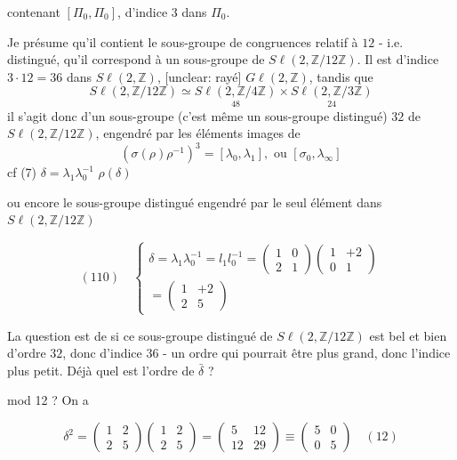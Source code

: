 contenant $[\Pi_0, \Pi_0]$, d'indice $3$ dans $\Pi_0$.

Je présume qu'il contient le sous-groupe
de congruences relatif à $12$ - i.e. distingué,
qu'il correspond à un sous-groupe de
$S\ell(2, \mathbb{Z}/12\mathbb{Z})$. Il est d'indice
$3 \cdot 12 = 36$ dans $S\ell(2, \mathbb{Z})$, [unclear: rayé] $G\ell(2, \mathbb{Z})$,
tandis que $$S\ell(2, \mathbb{Z}/12\mathbb{Z}) \simeq \underset{48}{S\ell(2, \mathbb{Z}/4\mathbb{Z})} \times \underset{24}{S\ell(2, \mathbb{Z}/3\mathbb{Z})}$$
il s'agit donc d'un sous-groupe (c'est même un sous-groupe distingué)
$32$ de $S\ell(2, \mathbb{Z}/12\mathbb{Z})$, engendré par les
éléments images de
$$ (\sigma(\rho)\rho^{-1})^3 = [\lambda_0, \lambda_1], \text{ ou } [\sigma_0, \lambda_\infty] $$
cf (7)
$\delta = \lambda_1 \lambda_0^{-1}$
$\rho(\delta)$

ou encore le sous-groupe distingué engendré par
le seul élément dans $S\ell(2, \mathbb{Z}/12\mathbb{Z})$

$$ (110) \quad \left\{ \begin{array}{l} \delta = \lambda_1 \lambda_0^{-1} = l_1 l_0^{-1} = \left(\begin{array}{cc} 1 & 0 \\ 2 & 1 \end{array}\right) \left(\begin{array}{cc} 1 & +2 \\ 0 & 1 \end{array}\right) \\ = \left(\begin{array}{cc} 1 & +2 \\ 2 & 5 \end{array}\right) \end{array} \right. $$

La question est de si ce sous-groupe
distingué de $S\ell(2, \mathbb{Z}/12\mathbb{Z})$ est bel et
bien d'ordre $32$, donc d'indice $36$ - un
ordre qui pourrait être plus grand, donc l'indice
plus petit. Déjà quel est l'ordre de $\bar{\delta}$ ?

\newpage


mod 12 ? On a

$$ \delta^2 = \begin{pmatrix} 1 & 2 \\ 2 & 5 \end{pmatrix} \begin{pmatrix} 1 & 2 \\ 2 & 5 \end{pmatrix} = \begin{pmatrix} 5 & 12 \\ 12 & 29 \end{pmatrix} \equiv \begin{pmatrix} 5 & 0 \\ 0 & 5 \end{pmatrix} \quad (12) $$

